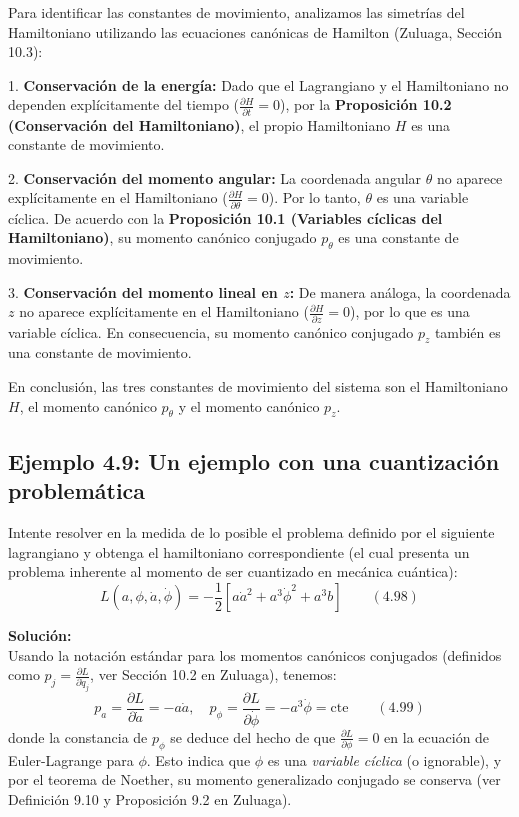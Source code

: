 \documentclass[a4paper]{article}
\begin{document}
Para identificar las constantes de movimiento, analizamos las simetrías del Hamiltoniano utilizando las ecuaciones canónicas de Hamilton (Zuluaga, Sección 10.3):

1. \textbf{Conservación de la energía:} Dado que el Lagrangiano y el Hamiltoniano no dependen explícitamente del tiempo ($\frac{\partial H}{\partial t} = 0$), por la \textbf{Proposición 10.2 (Conservación del Hamiltoniano)}, el propio Hamiltoniano $H$ es una constante de movimiento.

2. \textbf{Conservación del momento angular:} La coordenada angular $\theta$ no aparece explícitamente en el Hamiltoniano ($\frac{\partial H}{\partial \theta} = 0$). Por lo tanto, $\theta$ es una variable cíclica. De acuerdo con la \textbf{Proposición 10.1 (Variables cíclicas del Hamiltoniano)}, su momento canónico conjugado $p_\theta$ es una constante de movimiento.

3. \textbf{Conservación del momento lineal en $z$:} De manera análoga, la coordenada $z$ no aparece explícitamente en el Hamiltoniano ($\frac{\partial H}{\partial z} = 0$), por lo que es una variable cíclica. En consecuencia, su momento canónico conjugado $p_z$ también es una constante de movimiento.

En conclusión, las tres constantes de movimiento del sistema son el Hamiltoniano $H$, el momento canónico $p_\theta$ y el momento canónico $p_z$.


\subsection{Ejemplo 4.9: Un ejemplo con una cuantización problemática}


Intente resolver en la medida de lo posible el problema definido por el siguiente lagrangiano y obtenga el hamiltoniano correspondiente (el cual presenta un problema inherente al momento de ser cuantizado en mecánica cuántica):
$$
L(a, \phi, \dot{a}, \dot{\phi}) = -\frac{1}{2} \left[ a \dot{a}^2 + a^3 \dot{\phi}^2 + a^3 b \right] \qquad (4.98)
$$


\noindent \textbf{Solución:} \\
Usando la notación estándar para los momentos canónicos conjugados (definidos como $p_j = \frac{\partial L}{\partial \dot{q}_j}$, ver Sección 10.2 en Zuluaga), tenemos:
$$
p_a = \frac{\partial L}{\partial \dot{a}} = -a \dot{a}, \quad p_\phi = \frac{\partial L}{\partial \dot{\phi}} = -a^3 \dot{\phi} = \text{cte} \qquad (4.99)
$$
donde la constancia de $p_\phi$ se deduce del hecho de que $\frac{\partial L}{\partial \phi} = 0$ en la ecuación de Euler-Lagrange para $\phi$. Esto indica que $\phi$ es una \textit{variable cíclica} (o ignorable), y por el teorema de Noether, su momento generalizado conjugado se conserva (ver Definición 9.10 y Proposición 9.2 en Zuluaga).
\end{document}
